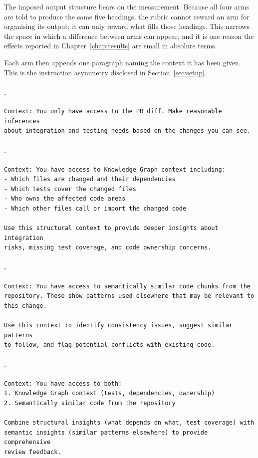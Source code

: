 The imposed output structure bears on the measurement. Because all four arms are
told to produce the same five headings, the rubric cannot reward an arm for
organising its output; it can only reward what fills those headings. This narrows
the space in which a difference between arms can appear, and it is one reason the
effects reported in Chapter~\ref{chap:results} are small in absolute terms.

Each arm then appends one paragraph naming the context it has been given. This is
the instruction asymmetry disclosed in Section~\ref{sec:setup}.

\paragraph{\baseline{}.}
{\footnotesize
\begin{verbatim}
Context: You only have access to the PR diff. Make reasonable inferences
about integration and testing needs based on the changes you can see.
\end{verbatim}
}

\paragraph{\kg{}.}
{\footnotesize
\begin{verbatim}
Context: You have access to Knowledge Graph context including:
- Which files are changed and their dependencies
- Which tests cover the changed files
- Who owns the affected code areas
- Which other files call or import the changed code

Use this structural context to provide deeper insights about integration
risks, missing test coverage, and code ownership concerns.
\end{verbatim}
}

\paragraph{\rag{}.}
{\footnotesize
\begin{verbatim}
Context: You have access to semantically similar code chunks from the
repository. These show patterns used elsewhere that may be relevant to
this change.

Use this context to identify consistency issues, suggest similar patterns
to follow, and flag potential conflicts with existing code.
\end{verbatim}
}

\paragraph{\hybrid{}.}
{\footnotesize
\begin{verbatim}
Context: You have access to both:
1. Knowledge Graph context (tests, dependencies, ownership)
2. Semantically similar code from the repository

Combine structural insights (what depends on what, test coverage) with
semantic insights (similar patterns elsewhere) to provide comprehensive
review feedback.
\end{verbatim}
}

